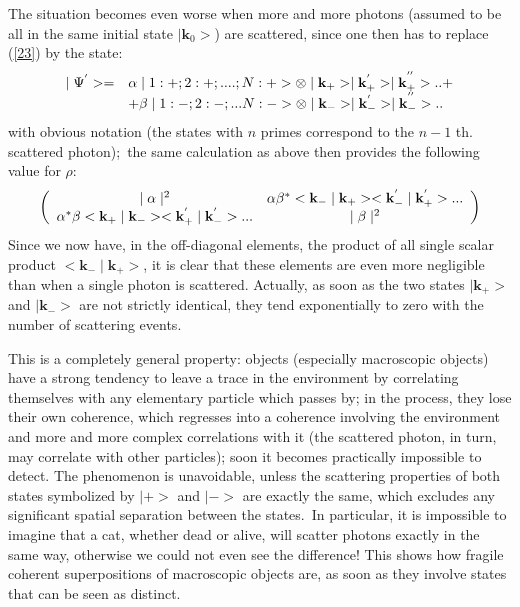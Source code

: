\documentclass[12pt,onecolumn]{article}%
\begin{document}
The situation becomes even worse when more and more photons (assumed to be all
in the same initial state $\mid\mathbf{k}_{0}>$) are scattered, since one then
has to replace (\ref{23}) by the state:%
\begin{equation}%
\begin{array}
[c]{cl}%
\mid\Psi^{^{\prime}}>= & \alpha\mid1:+;2:+;....;N:+>\otimes\mid\mathbf{k}%
_{+}>\mid\mathbf{k}_{+}^{^{\prime}}>\mid\mathbf{k}_{+}^{^{^{\prime\prime}}%
}>..+\\
& +\beta\mid1:-;2:-;...N:->\otimes\mid\mathbf{k}_{-}>\mid\mathbf{k}%
_{-}^{^{\prime}}>\mid\mathbf{k}_{-}^{^{^{\prime\prime}}}>..
\end{array}
\label{25}%
\end{equation}
with obvious notation (the states with $n$ primes correspond to the $n-1$ th.
scattered photon);\ the same calculation as above then provides the following
value for $\rho$:%
\begin{equation}
\left(
\begin{array}
[c]{cc}%
\mid\alpha\mid^{2} & \alpha\beta^{\ast}<\mathbf{k}_{-}\mid\mathbf{k}%
_{+}><\mathbf{k}_{-}^{^{\prime}}\mid\mathbf{k}_{+}^{^{\prime}}>...\\
\alpha^{\ast}\beta<\mathbf{k}_{+}\mid\mathbf{k}_{-}><\mathbf{k}_{+}^{^{\prime
}}\mid\mathbf{k}_{-}^{^{\prime}}>... & \mid\beta\mid^{2}%
\end{array}
\right)  \label{26}%
\end{equation}
Since we now have, in the off-diagonal elements, the product of all single
scalar product $<\mathbf{k}_{-}\mid\mathbf{k}_{+}>$, it is clear that these
elements are even more negligible than when a single photon is scattered.
Actually, as soon as the two states $\mid\mathbf{k}_{+}>$ and $\mid
\mathbf{k}_{-}>$ are not strictly identical, they tend exponentially to zero
with the number of scattering events.

This is a completely general property: objects (especially macroscopic
objects) have a strong tendency to leave a trace in the environment by
correlating themselves with any elementary particle which passes by; in the
process, they lose their own coherence, which regresses into a coherence
involving the environment and more and more complex correlations with it (the
scattered photon, in turn, may correlate with other particles); soon it
becomes practically impossible to detect. The phenomenon is unavoidable,
unless the scattering properties of both states symbolized by $\mid+>$ and
$\mid->$ are exactly the same, which excludes any significant spatial
separation between the states.\ In particular, it is impossible to imagine
that a cat, whether dead or alive, will scatter photons exactly in the same
way, otherwise we could not even see the difference! This shows how fragile
coherent superpositions of macroscopic objects are, as soon as they involve
states that can be seen as distinct.
\end{document}
